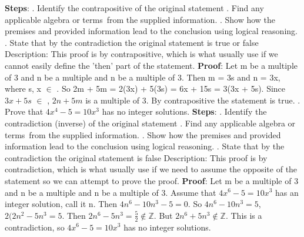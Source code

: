\documentclass{article}
\begin{document}
\newline \textbf{Steps}: . Identify the contrapositive of the original statement
. Find any applicable algebra or terms from the supplied information.
. Show how the premises and provided information lead to the conclusion using logical reasoning.
. State that by the contradiction the original statement is true or false
\newline Description: This proof is by contrapositive, which is what usually use if we cannot easily define the 'then' part of the statement.
\newline
\textbf{Proof}: Let m be a multiple of 3 and n  be a multiple and n  be a multiple of 3.
\newline
Then m = 3s and n = 3x, where s, x \(\in\) .
\newline
So 2m + 5m = 2(3x) + 5(3s) = 6x + 15s = 3(3x + 5s).
\newline
Since \(3x + 5s\) \(\in\) , \(2n +5m\) is a multiple of 3.
\newline
By contrapositive the statement is true.
\newline
{}. Prove that \(4x^4 - 5 = 10x^3\) has no integer solutions.
\newline \textbf{Steps}: . Identify the contradiction (inverse) of the original statement
. Find any applicable algebra or terms from the supplied information.
. Show how the premises and provided information lead to the conclusion using logical reasoning.
. State that by the contradiction the original statement is false
\newline Description: This proof is by contradiction, which is what usually use if we need to assume the opposite of the statement so we can attempt to prove the proof.
\newline
\textbf{Proof}: Let m be a multiple of 3 and n  be a multiple and n  be a multiple of 3.
\newline
Assume that \(4x^6 - 5 = 10x^3\) has an integer solution, call it n. 
\newline
Then \(4n^6 - 10n^3 - 5 = 0\). 
\newline
So \(4n^6 - 10n^3 = 5\), \(2(2n^2 - 5n^3 = 5\).
\newline
Then \(2n^6 - 5n^3 = \frac{5}{2} \notin \mathbb{Z}\).
\newline
But \(2n^6 + 5n^3 \notin \mathbb{Z}\).
\newline
This is a contradiction, so \(4x^6 - 5 = 10x^3\) has no integer solutions.
\end{document}

